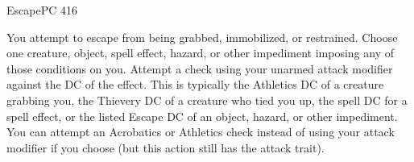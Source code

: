 \documentclass[12pt,openany,twocolumn]{book}
\begin{document}
\begin{action}{Escape}{}{PC 416}
    \begin{actioninfo}
    \end{actioninfo}

    \begin{actionbody}
        You attempt to escape from being grabbed, immobilized, or restrained. Choose one creature, object, spell effect, hazard, or other impediment imposing any of those conditions on you. Attempt a check using your unarmed attack modifier against the DC of the effect. This is typically the Athletics DC of a creature grabbing you, the Thievery DC of a creature who tied you up, the spell DC for a spell effect, or the listed Escape DC of an object, hazard, or other impediment. You can attempt an Acrobatics or Athletics check instead of using your attack modifier if you choose (but this action still has the attack trait).
    \end{actionbody}



\end{action}
\end{document}
